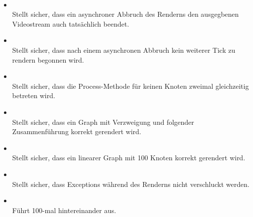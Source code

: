 \paragraph{}
\begin{itemize}
	\item {} \\
	Stellt sicher, dass ein asynchroner Abbruch des Renderns den ausgegbenen Videostream auch tatsächlich beendet.
    \item {} \\
    Stellt sicher, dass nach einem asynchronen Abbruch kein weiterer Tick zu rendern begonnen wird.
    \item {} \\
    Stellt sicher, dass die Process-Methode für keinen Knoten zweimal gleichzeitig betreten wird.
    \item {} \\
    Stellt sicher, dass ein Graph mit Verzweigung und folgender Zusammenführung korrekt gerendert wird.
    \item {} \\
    Stellt sicher, dass ein linearer Graph mit 100 Knoten korrekt gerendert wird.
    \item {} \\
    Stellt sicher, dass Exceptions während des Renderns nicht verschluckt werden.
    \item {} \\
    Führt  100-mal hintereinander aus.
\end{itemize}

\paragraph{}

